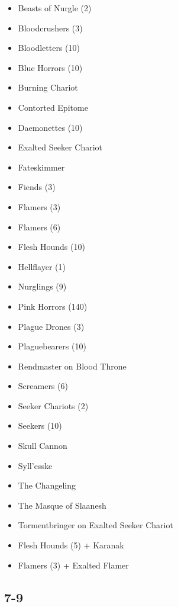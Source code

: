 \documentclass{HordeModeTarot}
\begin{document}
\begin{multicols}{2}
\begin{itemize}[leftmargin=*]
\item[] Beasts of Nurgle (2)
\item[] Bloodcrushers (3)
\item[] Bloodletters (10)
\item[] Blue Horrors (10)
\item[] Burning Chariot
\item[] Contorted Epitome
\item[] Daemonettes (10)
\item[] Exalted Seeker Chariot
\item[] Fateskimmer
\item[] Fiends (3)
\item[] Flamers (3)
\item[] Flamers (6)
\item[] Flesh Hounds (10)
\item[] Hellflayer (1)
\item[] Nurglings (9)
\item[] Pink Horrors (140)
\item[] Plague Drones (3)
\item[] Plaguebearers (10)
\item[] Rendmaster on Blood Throne
\item[] Screamers (6)
\item[] Seeker Chariots (2)
\item[] Seekers (10)
\item[] Skull Cannon
\item[] Syll'esske
\item[] The Changeling
\item[] The Masque of Slaanesh
\item[] Tormentbringer on Exalted Seeker Chariot
\item[] Flesh Hounds (5) + Karanak
\item[] Flamers (3) + Exalted Flamer
\end{itemize}

\subsection*{7-9}


\end{multicols}
\end{document}
